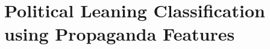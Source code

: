












\section{\statusgreen Political Leaning Classification using Propaganda Features}
\label{ssec:ps_prop_leaning_classifier}

